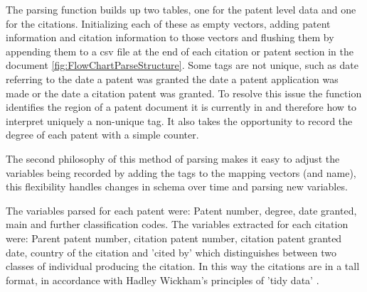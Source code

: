 The parsing function builds up two tables, one for the patent level data and one for the citations. Initializing each of these as empty vectors, adding patent information and citation information to those vectors and flushing them by appending them to a csv file at the end of each citation or patent section in the document \ref{fig:FlowChartParseStructure}. Some tags are not unique, such as date referring to the date a patent was granted the date a patent application was made or the date a citation patent was granted. To resolve this issue the function identifies the region of a patent document it is currently in and therefore how to interpret uniquely a non-unique tag. It also takes the opportunity to record the degree of each patent with a simple counter. 

The second philosophy of this method of parsing makes it easy to adjust the variables being recorded by adding the tags to the mapping vectors (and name), this flexibility handles changes in schema over time and parsing new variables. 

The variables parsed for each patent were: Patent number, degree, date granted, main and further classification codes. The variables extracted for each citation were: Parent patent number, citation patent number, citation patent granted date, country of the citation and 'cited by' which distinguishes between two classes of individual producing the citation. In this way the citations are in a tall format, in accordance with Hadley Wickham's principles of 'tidy data' \cite{wickham2014tidy}. 

